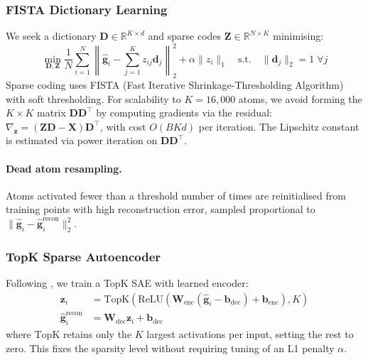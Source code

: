 \subsubsection{FISTA Dictionary Learning}

We seek a dictionary $\mathbf{D} \in \mathbb{R}^{K \times d}$ and sparse codes $\mathbf{Z} \in \mathbb{R}^{N \times K}$ minimising:
\begin{equation}
    \min_{\mathbf{D}, \mathbf{Z}} \frac{1}{N} \sum_{i=1}^{N} \left\| \hat{\mathbf{g}}_i - \sum_{j=1}^{K} z_{ij} \mathbf{d}_j \right\|_2^2 + \alpha \|z_i\|_1 \quad \text{s.t.} \quad \|\mathbf{d}_j\|_2 = 1 \;\forall j
\end{equation}
Sparse coding uses FISTA (Fast Iterative Shrinkage-Thresholding Algorithm) with soft thresholding. For scalability to $K{=}16{,}000$ atoms, we avoid forming the $K \times K$ matrix $\mathbf{D}\mathbf{D}^\top$ by computing gradients via the residual: $\nabla_{\mathbf{z}} = (\mathbf{Z}\mathbf{D} - \mathbf{X})\mathbf{D}^\top$, with cost $O(BKd)$ per iteration. The Lipschitz constant is estimated via power iteration on $\mathbf{D}\mathbf{D}^\top$.

\paragraph{Dead atom resampling.} Atoms activated fewer than a threshold number of times are reinitialised from training points with high reconstruction error, sampled proportional to $\|\hat{\mathbf{g}}_i - \hat{\mathbf{g}}_i^{\text{recon}}\|_2^2$.

\subsubsection{TopK Sparse Autoencoder}

Following \citet{gao2024scaling}, we train a TopK SAE with learned encoder:
\begin{align}
    \mathbf{z}_i &= \text{TopK}\!\left(\text{ReLU}\!\left(\mathbf{W}_{\text{enc}}(\hat{\mathbf{g}}_i - \mathbf{b}_{\text{dec}}) + \mathbf{b}_{\text{enc}}\right), K\right) \\
    \hat{\mathbf{g}}_i^{\text{recon}} &= \mathbf{W}_{\text{dec}} \mathbf{z}_i + \mathbf{b}_{\text{dec}}
\end{align}
where $\text{TopK}$ retains only the $K$ largest activations per input, setting the rest to zero. This fixes the sparsity level without requiring tuning of an L1 penalty $\alpha$.

